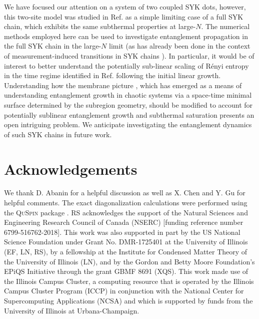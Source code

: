 \documentclass[reprint, floatfix,eqsecnum,superscriptaddress,preprint,nofootinbib,onecolumn,amsmath,amssymb,aps,prb]{revtex4-2}
\begin{document}
We have focused our attention on a system of two coupled SYK dots, %
however, this two-site model was studied in Ref. \cite{Gu2017b} as a simple limiting case of a full SYK chain, which exhibits the same subthermal properties at large-$N$. The numerical methods employed here can be used to investigate entanglement propagation in the full SYK chain in the large-$N$ limit (as has already been done in the context of measurement-induced transitions in SYK chains \cite{Liu2020}). In particular, it would be of interest to better understand the potentially sub-linear scaling of R\'enyi entropy in the time regime identified in Ref. \cite{Gu2017b} following the initial linear growth. Understanding how the membrane picture \cite{Nahum2017,Nahum2018,Jonay2018,vonKeyserlingk2018,Zhou2020}, which has emerged as a means of understanding entanglement growth in chaotic systems via a space-time minimal surface determined by the subregion geometry, should be modified to account for potentially sublinear entanglement growth and subthermal saturation presents an open intriguing problem. 
We anticipate investigating the entanglement dynamics of such SYK chains in future work.


\section*{Acknowledgements}
We thank D. Abanin for a helpful discussion as well as X. Chen and Y. Gu for helpful comments. The exact diagonalization calculations were performed using the \textsc{QuSpin} package \cite{Quspin1,Quspin2}. RS acknowledges the support of the Natural Sciences and Engineering Research Council of Canada (NSERC) [funding reference number 6799-516762-2018]. This work was also supported in part by the US National Science Foundation under Grant No. DMR-1725401 at the University of Illinois (EF, LN, RS), by a fellowship at the Institute for Condensed Matter Theory of the University of Illinois (LN), and by the Gordon and Betty Moore Foundation's EPiQS Initiative through the grant GBMF 8691 (XQS). This work made use of the Illinois Campus Cluster, a computing resource that is operated by the Illinois Campus Cluster Program (ICCP) in conjunction with the National Center for Supercomputing Applications (NCSA) and which is supported by funds from the University of Illinois at Urbana-Champaign.
\end{document}
